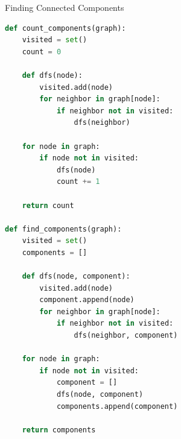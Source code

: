 \documentclass[aspectratio=169]{beamer}
\begin{document}
\begin{frame}[fragile]{Finding Connected Components}
  \begin{lstlisting}[language=Python, basicstyle=\ttfamily\footnotesize]
def count_components(graph):
    visited = set()
    count = 0

    def dfs(node):
        visited.add(node)
        for neighbor in graph[node]:
            if neighbor not in visited:
                dfs(neighbor)

    for node in graph:
        if node not in visited:
            dfs(node)
            count += 1

    return count

def find_components(graph):
    visited = set()
    components = []

    def dfs(node, component):
        visited.add(node)
        component.append(node)
        for neighbor in graph[node]:
            if neighbor not in visited:
                dfs(neighbor, component)

    for node in graph:
        if node not in visited:
            component = []
            dfs(node, component)
            components.append(component)

    return components
  \end{lstlisting}
\end{frame}
\end{document}
